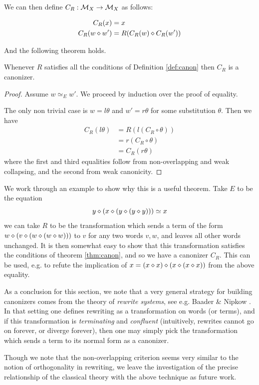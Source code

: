 We can then define $C_R : {\mathcal{M}}_X\rightarrow{\mathcal{M}}_X$ as follows:

\begin{align}
  C_R(x) &= x\\
  C_R(w\diamond w') &= R(C_R(w)\diamond C_R(w'))
\end{align}

And the following theorem holds.
\begin{theorem}\label{thm:canon}
  Whenever $R$ satisfies all the conditions of Definition \ref{def:canon} then $C_R$ is a canonizer.
\end{theorem}
\begin{proof}
  Assume $w\simeq_{E}w'$. We proceed by induction over the proof of equality.

  The only non trivial case is $w = l\theta$ and $w'=r\theta$ for some substitution $\theta$.
  Then we have
  \begin{align}
    C_R(l\theta) &= R(l(C_R\circ\theta)) \\
                 &= r(C_R\circ\theta)\\
                 &= C_R(r\theta)
  \end{align}
  where the first and third equalities follow from non-overlapping and weak collapsing, and the second from weak canonicity.
\end{proof}

We work through an example to show why this is a useful theorem. Take $E$ to be the equation
\[
  y \diamond (x \diamond (y \diamond (y \diamond y)))\simeq x
\]
we can take $R$ to be the transformation which sends a term of the form $w \diamond (v \diamond (w \diamond (w \diamond w)))$ to $v$ for any two words $v, w$, and leaves all other words unchanged.
It is then somewhat easy to show that this transformation satisfies the conditions of theorem \ref{thm:canon}, and so we have a canonizer $C_R$.
This can be used, e.g. to refute the implication of $x = (x \diamond x) \diamond (x \diamond (x \diamond x))$ from the above equality.

As a conclusion for this section, we note that a very general strategy for building canonizers comes from the theory of \emph{rewrite systems}, see e.g. Baader \& Nipkow \cite{term-rewriting}.
In that setting one defines rewriting as a transformation on words (or terms), and if this transformation is \emph{terminating} and \emph{confluent} (intuitively, rewrites cannot go on forever, or diverge forever), then one may simply pick the transformation which sends a term to its normal form as a canonizer.

Though we note that the non-overlapping criterion seems very similar to the notion of orthogonality in rewriting, we leave the investigation of the precise relationship of the classical theory with the above technique as future work.

